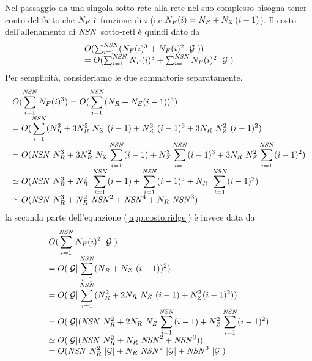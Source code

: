 Nel passaggio da una singola sotto-rete alla rete nel suo complesso bisogna tener conto del fatto che $N_F$ è funzione di $i$ (i.e.$N_F(i) = N_R + N_Z\, (i-1)$).
Il costo dell'allenamento di $\mathit{NSN}$ sotto-reti è quindi dato da
\begin{equation}\label{app:costo:ridge}
\begin{array}{l}
O(\sum_{i=1}^{\mathit{NSN}} (N_F(i)^3 + N_F(i)^2\ \lvert\mathcal{G}\rvert)) \\
= O(\sum_{i=1}^{\mathit{NSN}} N_F(i)^3 + \sum_{i=1}^{\mathit{NSN}} N_F(i)^2\ \lvert\mathcal{G}\rvert) \\
\end{array}
\end{equation}
Per semplicità, consideriamo le due sommatorie separatamente.
\begin{equation}\label{app:costo:ridge1}
\begin{array}{l}
\displaystyle O(\sum_{i=1}^{\NSN} \Nf(i)^3) = O(\sum_{i=1}^{\NSN} (\Nr + \Nz (i-1))^3) \\
\displaystyle = O(\sum_{i=1}^{\NSN} (\Nr^3 + 3 \Nr^2\ \Nz\ (i-1) + \Nz^3\ (i-1)^3 + 3 \Nr\ \Nz^2\ (i-1)^2)\\
\displaystyle = O(\NSN\ \Nr^3 + 3 \Nr^2\ \Nz \sum_{i=1}^{\NSN} (i-1) + \Nz^3 \sum_{i=1}^{\NSN} (i-1)^3 + 3 \Nr\ \Nz^2 \sum_{i=1}^{\NSN} (i-1)^2 )\\
\displaystyle \simeq O(\NSN\ \Nr^3 + \Nr^2\ \sum_{i=1}^{\NSN} (i-1) + \sum_{i=1}^{\NSN} (i-1)^3 + \Nr\ \sum_{i=1}^{\NSN} (i-1)^2 )\\
\displaystyle \simeq O(\NSN\ \Nr^3 + \Nr^2\ \NSN^2 + \NSN^4 + \Nr\ \NSN^3 )\\
\end{array}
\end{equation}
la seconda parte dell'equazione (\ref{app:costo:ridge}) è invece data da
\begin{equation}\label{app:costo:ridge2}
\begin{array}{l}
\displaystyle O(\sum_{i=1}^{\mathit{NSN}} N_F(i)^2\ \lvert\mathcal{G}\rvert)\\
\displaystyle = O(\lvert\mathcal{G}\rvert  \sum_{i=1}^{\mathit{NSN}} (N_R + N_Z\ (i-1))^2) \\
\displaystyle = O(\lvert\mathcal{G}\rvert  \sum_{i=1}^{\mathit{NSN}} (N_R^2 + 2 N_R\ N_Z\ (i-1) + N_Z^2 (i-1)^2)) \\
\displaystyle = O(\lvert\mathcal{G}\rvert  (\mathit{NSN}\ N_R^2 + 2N_R\ N_Z \sum_{i=1}^{\mathit{NSN}}(i-1) + N_Z^2 \sum_{i=1}^{\mathit{NSN}}(i-1)^2)\\
\displaystyle \simeq O(\lvert\mathcal{G}\rvert (\mathit{NSN}\ N_R^2 + N_R\ \mathit{NSN}^2 + \mathit{NSN}^3)) \\
\displaystyle = O(\mathit{NSN}\ N_R^2\ \lvert\mathcal{G}\rvert + N_R\ \mathit{NSN}^2\ \lvert\mathcal{G}\rvert + \mathit{NSN}^3\ \lvert\mathcal{G}\rvert) \\
\end{array}
\end{equation}

